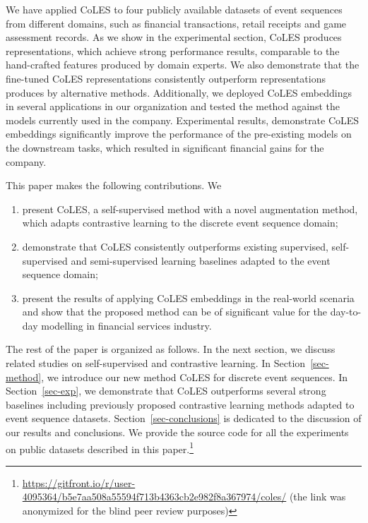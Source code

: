 \documentclass[sigconf]{acmart}
\begin{document}
We have applied CoLES to four publicly available datasets of event sequences from different
domains, such as financial transactions, retail receipts and game assessment records. As we
show in the experimental section, CoLES produces representations, which achieve strong
performance results, comparable to the hand-crafted features produced by domain experts.
We also demonstrate that the fine-tuned CoLES representations consistently outperform
representations produces by alternative methods.
%
%
Additionally, we deployed CoLES embeddings in several applications in our organization and tested
the method against the models currently used in the company. Experimental results, demonstrate
CoLES embeddings significantly improve the performance of the pre-existing models on the downstream
tasks, which resulted in significant financial gains for the company.

This paper makes the following contributions. We
\begin{enumerate}
    \item present CoLES, a self-supervised method with a novel augmentation method, which adapts
    contrastive learning to the discrete event sequence domain;

    \item demonstrate that CoLES consistently outperforms existing supervised, self-supervised and
    semi-supervised learning baselines adapted to the event sequence domain;

    \item present the results of applying CoLES embeddings in the real-world scenaria and show
    that the proposed method can be of significant value for the day-to-day modelling in financial
    services industry.
\end{enumerate}

The rest of the paper is organized as follows. In the next section, we discuss related studies
on self-supervised and contrastive learning. In Section~\ref{sec-method}, we introduce our new
method CoLES for discrete event sequences. In Section~\ref{sec-exp}, we demonstrate that CoLES
outperforms several strong baselines including previously proposed contrastive learning methods
adapted to event sequence datasets. Section~\ref{sec-conclusions} is dedicated to the discussion
of our results and conclusions.
% 
We provide the source code for all the experiments on public datasets described in this paper.\footnote{
    \url{https://gitfront.io/r/user-4095364/b5e7aa508a55594f713b4363cb2e982f8a367974/coles/}
    (the link was anonymized for the blind peer review purposes)
}
\end{document}
